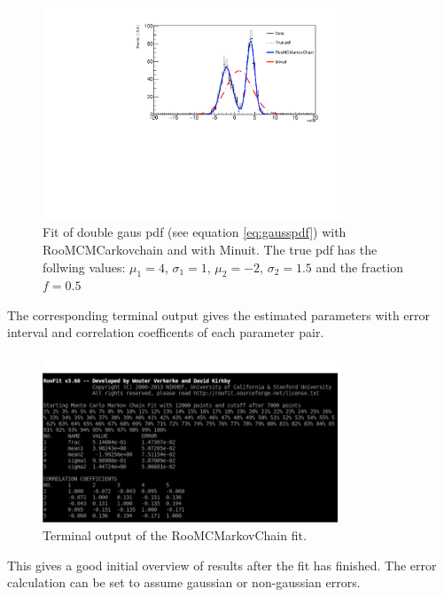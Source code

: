 \documentclass[english]{uzhpub}
\begin{document}
\begin{figure}[H]
  \centering
  \includegraphics[width=0.8\textwidth]{RooMCMC/twogausfit}
  \caption{Fit of double gaus pdf (see equation \ref{eq:gausspdf}) with RooMCMCarkovchain and with Minuit. The true pdf has the follwing values: $\mu_1 = 4$, $\sigma_1 = 1$, $\mu_2 = -2$, $\sigma_2 = 1.5$ and the fraction $f = 0.5$}
  \label{fig:twogaus}
\end{figure}

The corresponding terminal output gives the estimated parameters with error interval and correlation coefficents of each parameter pair.

\begin{figure}[H]
  \centering
  \includegraphics[width=0.8\textwidth]{RooMCMC/terminal_output}
  \caption{Terminal output of the RooMCMarkovChain fit.}
  \label{fig:terminal}
\end{figure}
This gives a good initial overview of results after the fit has finished. The error calculation can be set to assume gaussian or non-gaussian errors.
\end{document}
